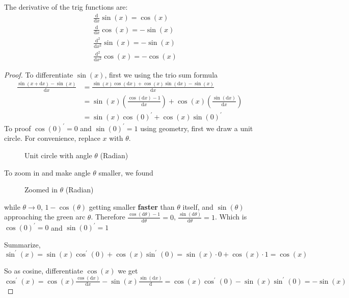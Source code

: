 \begin{enumerate}
        The derivative of the trig functions are:
        \begin{align*}
            & \frac{\mathrm{d}}{\mathrm{d}x}\sin(x)=\cos(x) \\
            & \frac{\mathrm{d}}{\mathrm{d}x}\cos(x)=-\sin(x) \\
            & \frac{\mathrm{d}^2}{\mathrm{d}x^2}\sin(x)=-\sin(x) \\
            & \frac{\mathrm{d}^2}{\mathrm{d}x^2}\cos(x)=-\cos(x)
        \end{align*}
        \begin{proof}
            To differentiate $\sin(x)$, first we using the trio sum formula
            \begin{align*}
                \frac{\sin(x+\mathrm{d}x)-\sin(x)}{\mathrm{d}x} & =\frac{\sin(x)\cos(\mathrm{d}x)+\cos(x)\sin(\mathrm{d}x)-\sin(x)}{\mathrm{d}x} & \\
                                                                & =\sin(x)\left(\frac{\cos(\mathrm{d}x)-1}{\mathrm{d}x}\right)+\cos(x)\left(\frac{\sin(\mathrm{d}x)}{\mathrm{d}x}\right) \\
                                                                & =\sin(x)\cos(0)^\prime+\cos(x)\sin(0)^\prime
            \end{align*}
            To proof $\cos(0)^\prime=0$ and $\sin(0)^\prime=1$ using geometry, first we draw a unit circle. For convenience, replace $x$ with $\theta$.
            \begin{figure}[H]
                \centering
                \caption{Unit circle with angle $\theta$ (Radian)}
            \end{figure}
            To zoom in and make angle $\theta$ smaller, we found
            \begin{figure}[H]
                \centering
                \caption{Zoomed in $\theta$ (Radian)}
            \end{figure}
            while $\theta\to 0$, $1-\cos(\theta)$ getting smaller \textbf{faster} than $\theta$ itself, and $\sin(\theta)$ approaching the green arc $\theta$. Therefore $\frac{\cos(\mathrm{d}\theta)-1}{\mathrm{d}\theta}=0$, $\frac{\sin(\mathrm{d}\theta)}{\mathrm{d}\theta}=1$. Which is $\cos(0)^\prime=0$ and $\sin(0)^\prime=1$

            Summarize, $\sin^\prime(x)=\sin(x)\cos^\prime(0)+\cos(x)\sin^\prime(0)=\sin(x)\cdot 0+\cos(x)\cdot 1=\cos(x)$

            So as cosine, differentiate $\cos(x)$ we get $\cos^\prime(x)=\cos(x)\frac{\cos(\mathrm{d}x)}{\mathrm{d}x}-\sin(x)\frac{\sin(\mathrm{d}x)}{\mathrm{d}}=\cos(x)\cos^\prime(0)-\sin(x)\sin^\prime(0)=-\sin(x)$
            \end{proof}
\end{enumerate}
